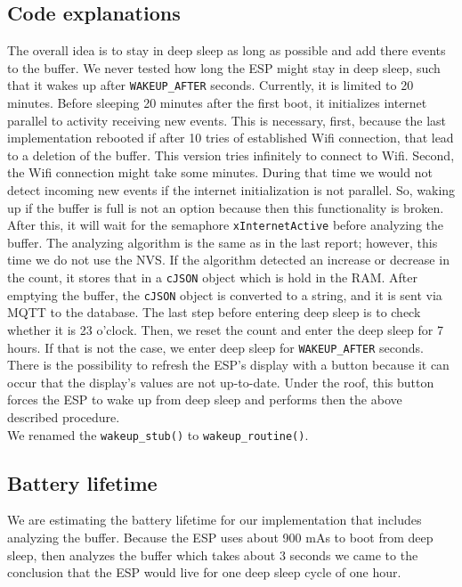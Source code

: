 \subsection{Code explanations}
The overall idea is to stay in deep sleep as long as possible and add there events to the buffer.
We never tested how long the ESP might stay in deep sleep,
such that it wakes up after \verb!WAKEUP_AFTER! seconds. Currently, it is limited to 20 minutes.
Before sleeping 20 minutes after the first boot, it initializes internet parallel to
activity receiving new events. This is necessary, first, because the last implementation
rebooted if after 10 tries of established Wifi connection, that lead to a deletion of the buffer.
This version tries infinitely to connect to Wifi.
Second, the Wifi connection might take some minutes. During that time we would not detect
incoming new events if the internet initialization is not parallel. So, waking up if the buffer is full
is not an option because then this functionality is broken.
After this, it will wait for the semaphore \verb!xInternetActive!
before analyzing the buffer. The analyzing algorithm is the same as in the last report; however,
this time we do not use the NVS. If the algorithm detected an increase or decrease in the count,
it stores that in a \verb!cJSON! object which is hold in the RAM.
After emptying the buffer, the \verb!cJSON! object is converted to a string, and it is sent via MQTT to
the database. The last step before entering deep sleep is to check whether it is 23 o'clock.
Then, we reset the count and enter the deep sleep for 7 hours. If that is not the case,
we enter deep sleep for \verb!WAKEUP_AFTER! seconds.\\
There is the possibility to refresh the ESP's display with a button because it can occur that the display's values
are not up-to-date. Under the roof, this button forces the ESP to wake up from deep sleep and
performs then the above described procedure. \\
We renamed the \verb!wakeup_stub()! to \verb!wakeup_routine()!.





\subsection{Battery lifetime}
We are estimating the battery lifetime for our implementation that includes analyzing the buffer.
Because the ESP uses about 900 mAs to boot from deep sleep, then analyzes the buffer which takes
about 3 seconds we came to the conclusion that the ESP would live for one deep sleep cycle of
one hour.